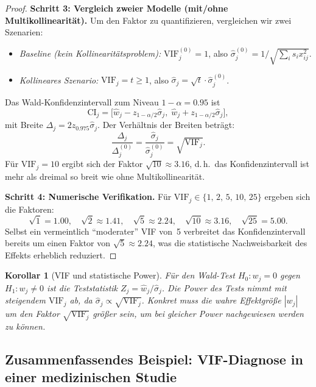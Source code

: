 ﻿\documentclass[12pt, a4paper]{article}
\newtheorem{corollary}[theorem]{Korollar}
\theoremstyle{definition}
\theoremstyle{remark}
\begin{document}
\begin{proof}
	\textbf{Schritt 3: Vergleich zweier Modelle (mit/ohne Multikollinearität).}
	Um den Faktor zu quantifizieren, vergleichen wir zwei Szenarien:
	\begin{itemize}
		\item \emph{Baseline (kein Kollinearitätsproblem):} $\mathrm{VIF}_j^{(0)} = 1$, also
		$\hat{\sigma}_j^{(0)} = 1/\sqrt{\sum_i s_i x_{ij}^2}$.
		\item \emph{Kollineares Szenario:} $\mathrm{VIF}_j = t \geq 1$, also
		$\hat{\sigma}_j = \sqrt{t}\cdot\hat{\sigma}_j^{(0)}$.
	\end{itemize}
	Das Wald-Konfidenzintervall zum Niveau $1-\alpha = 0.95$ ist
	\[
	\mathrm{CI}_j = \bigl[\hat{w}_j - z_{1-\alpha/2}\hat{\sigma}_j,\;
	\hat{w}_j + z_{1-\alpha/2}\hat{\sigma}_j\bigr],
	\]
	mit Breite $\Delta_j = 2z_{0.975}\hat{\sigma}_j$. Der Verhältnis der Breiten beträgt:
	\[
	\frac{\Delta_j}{\Delta_j^{(0)}} = \frac{\hat{\sigma}_j}{\hat{\sigma}_j^{(0)}} = \sqrt{\mathrm{VIF}_j}.
	\]
	Für $\mathrm{VIF}_j = 10$ ergibt sich der Faktor $\sqrt{10} \approx 3.16$, d.\,h.\ das
	Konfidenzintervall ist mehr als dreimal so breit wie ohne Multikollinearität.
	
	\textbf{Schritt 4: Numerische Verifikation.}
	Für $\mathrm{VIF}_j \in \{1,\,2,\,5,\,10,\,25\}$ ergeben sich die Faktoren:
	\[
	\sqrt{1} = 1.00,\quad \sqrt{2} \approx 1.41,\quad \sqrt{5} \approx 2.24,\quad
	\sqrt{10} \approx 3.16,\quad \sqrt{25} = 5.00.
	\]
	Selbst ein vermeintlich ``moderater'' VIF von~5 verbreitet das Konfidenzintervall
	bereits um einen Faktor von $\sqrt{5} \approx 2.24$, was die statistische Nachweisbarkeit
	des Effekts erheblich reduziert.
\end{proof}

\begin{corollary}[VIF und statistische Power]
	Für den Wald-Test $H_0: w_j = 0$ gegen $H_1: w_j \neq 0$ ist die Teststatistik
	$Z_j = \hat{w}_j / \hat{\sigma}_j$. Die Power des Tests nimmt mit steigendem $\mathrm{VIF}_j$
	ab, da $\hat{\sigma}_j \propto \sqrt{\mathrm{VIF}_j}$. Konkret muss die wahre Effektgröße
	$|w_j|$ um den Faktor $\sqrt{\mathrm{VIF}_j}$ größer sein, um bei gleicher Power
	nachgewiesen werden zu können.
\end{corollary}

\subsection{Zusammenfassendes Beispiel: VIF-Diagnose in einer medizinischen Studie}
\end{document}
